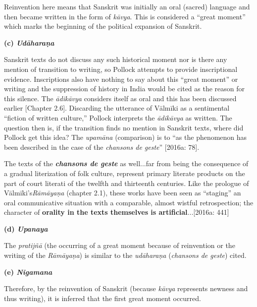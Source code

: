Reinvention here means that Sanskrit was initially an oral (sacred) language and then became written in the form of \textit{kāvya}. This is considered a “great moment” which marks the beginning of the political expansion of Sanskrit.

\textbf{(c) \textit{Udāharaṇa}}

Sanskrit texts do not discuss any such historical moment nor is there any mention of transition to writing, so Pollock attempts to provide inscriptional evidence. Inscriptions also have nothing to say about this “great moment” or writing and the suppression of history in India would be cited as the reason for this silence. The \textit{ādikāvya }considers itself as oral and this has been discussed earlier [Chapter 2.6]. Discarding the utterance of Vālmīki as a sentimental “ﬁction of written culture,” Pollock interprets the \textit{ādikāvya }as written. The question then is, if the transition finds no mention in Sanskrit texts, where did Pollock get this idea? The \textit{upamāna} (comparison) is to “as the phenomenon has been described in the case of the \textit{chansons de geste}” [2016a: 78].

\begin{myquote}
The texts of the \textit{\textbf{chansons de geste}} as well...far from being the consequence of a gradual literization of folk culture, represent primary literate products on the part of court literati of the twelfth and thirteenth centuries. Like the prologue of Vālmīki’s\textit{Rāmāyaṇa} (chapter 2.1), these works have been seen as “staging” an oral communicative situation with a comparable, almost wistful retrospection; the character of \textbf{orality in the texts themselves is artiﬁcial}...[2016a: 441]
\end{myquote}

\textbf{(d) \textit{Upanaya}}

The \textit{pratijñā }(the occurring of a great moment because of reinvention or the writing of the \textit{Rāmāyaṇa}) is similar to the \textit{udāharaṇa} (\textit{chansons de geste}) cited.

\textbf{(e) \textit{Nigamana}}

Therefore, by the reinvention of Sanskrit (because \textit{kāvya} represents newness and thus writing), it is inferred that the first great moment occurred.

